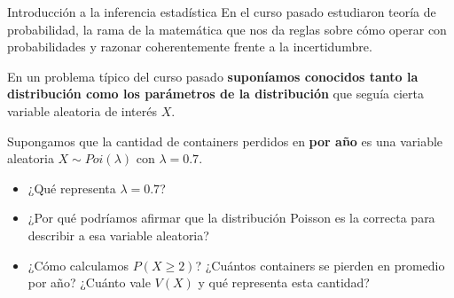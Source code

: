 \documentclass{beamer}
\theoremstyle{definition}
\begin{document}
\begin{frame}{\color{rosee}Introducci\'on a la inferencia estadística}
\small
  En el curso pasado estudiaron teor\'ia de probabilidad, la rama de la
  matem\'atica que nos da reglas sobre c\'omo operar con probabilidades
  y razonar coherentemente frente a la incertidumbre.

  \bigskip En un problema t\'ipico del curso pasado \textbf{supon\'iamos conocidos tanto la distribuci\'on como los parámetros de la distribución} que segu\'ia cierta
  variable aleatoria de inter\'es $X$.

  \begin{example}
    Supongamos que la cantidad de containers perdidos en  \textbf{por año} es una variable aleatoria $X\sim Poi(\lambda)$ con $\lambda=0.7$.
  \end{example}
  \vspace{6pt}
  \begin{itemize}
      \item ¿Qué representa $\lambda=0.7$?
      \item ¿Por qué podríamos afirmar que la distribución Poisson es la correcta para describir a esa variable aleatoria?
      \item ¿Cómo calculamos $P(X\geq 2)$? ¿Cuántos containers se pierden en promedio por año? ¿Cuánto vale $V(X)$ y qué representa esta cantidad?
  \end{itemize}
\end{frame}
\end{document}
